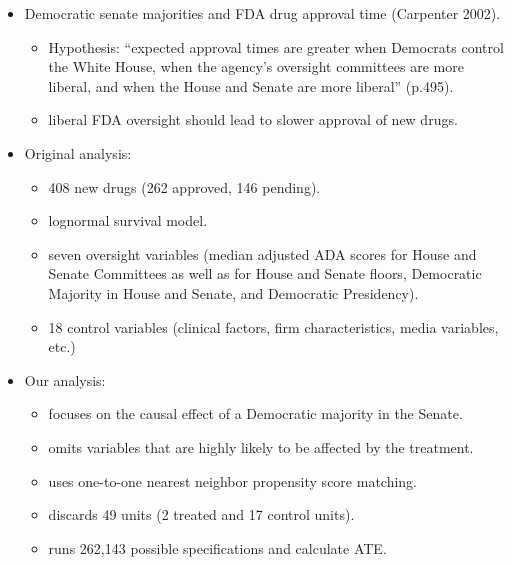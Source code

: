 \documentclass[20pt,landscape,pdftex]{foils}
\begin{document}
\begin{itemize}
\item Democratic senate majorities and FDA drug approval time
  (Carpenter 2002).\pause
  \begin{itemize}
  \item Hypothesis: ``expected approval times are greater when
    Democrats control the White House, when the agency's oversight
    committees are more liberal, and when the House and Senate are
    more liberal'' (p.495).\pause
  \item liberal FDA oversight should lead to slower approval of new
    drugs.\pause 
  \end{itemize}

\item Original analysis:\pause
  \begin{itemize}
  \item 408 new drugs (262 approved, 146 pending).\pause
  \item lognormal survival model.\pause
  \item seven oversight variables (median adjusted ADA scores for
    House and Senate Committees as well as for House and Senate
    floors, Democratic Majority in House and Senate, and Democratic
    Presidency).\pause
  \item 18 control variables (clinical factors, firm characteristics,
    media variables, etc.)\pause
  \end{itemize}

\item Our analysis:\pause
  \begin{itemize}
  \item focuses on the causal effect of a Democratic majority in the
    Senate.\pause
  \item omits variables that are highly likely to be affected by the
    treatment.\pause
  \item uses one-to-one nearest neighbor propensity score matching.\pause
  \item discards 49 units (2 treated and 17 control units).\pause
  \item runs 262,143 possible specifications and calculate ATE.\pause
  \end{itemize}
\end{itemize}


\end{document}
